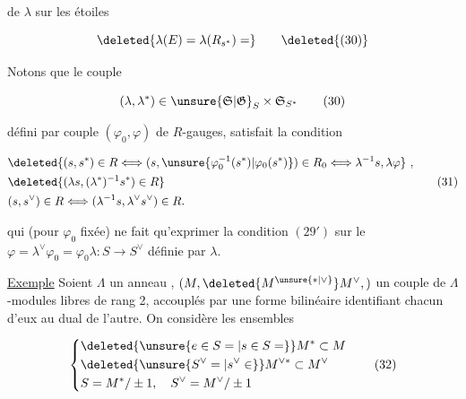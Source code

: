 
de $\lambda$ sur les étoiles  

\[
 \deleted{\lambda(E)=\lambda(R_{s^*})=}\tag*{\deleted{(30)}}
\]

Notons que  le couple

\[
 (\lambda,\lambda^*)\in\unsure{\mathfrak S|\mathfrak G}_{S}\times\mathfrak S_{S^*} \tag*{(30)}
\]

défini par  couple $(\varphi_0,\varphi)$ de $R$-gauges,
satisfait la condition

\[
 \begin{aligned}
 &\deleted{(s,s^*)\in R\Longleftrightarrow(s,\unsure{\varphi_0^{-1}(s^*)|\varphi_0(s^*)})\in R_0
 \Longleftrightarrow\lambda^{-1}s,\lambda\varphi}\ ,\\
 &\deleted{(\lambda s,(\lambda^*)^{-1}s^*)\in R}\\
 &(s,s^\vee)\in R\Longleftrightarrow(\lambda^{-1}s,\lambda^\vee s^\vee)\in R .
 \end{aligned}\tag*{(31)}
\]

 qui  (pour $\varphi_0$ fixée) ne fait qu'exprimer la condition
$(29')$ sur le $\varphi=\lambda^\vee\varphi_0=\varphi_0\lambda:S\longrightarrow S^\vee$ définie par  $\lambda$.


\uline{Exemple}  Soient $\Lambda$ un anneau , $(M,\deleted{M^{\unsure{*|\vee}}}M^\vee,)$
 un couple de $\Lambda$-modules
libres de rang 2, accouplés par une forme bilinéaire
identifiant chacun d'eux au dual de l'autre. On
considère les  ensembles

\[
 \left\{\begin{aligned}
 &\deleted{\unsure{e\in S=|s\in S=}}M^*\subset M\\
 &\deleted{\unsure{S^\vee=|s^\vee\in}}M^{\vee *}\subset M^\vee\\
 &S=M^*/\pm1,\quad S^\vee=M^\vee/\pm1
 \end{aligned}\right.\tag*{(32)}
\]


